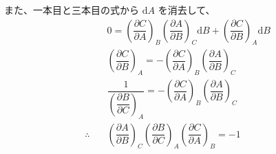 \documentclass[uplatex,dvipdfmx,a4paper,11pt]{jsarticle}
\newcommand{\diff}{\mathrm d}
\begin{document}
また、一本目と三本目の式から $\diff A$ を消去して、
\begin{align*}
&0 = \left(\dfrac{\partial C}{\partial A} \right)_B \left(\dfrac{\partial A}{\partial B} \right)_C \diff B + \left(\dfrac{\partial C}{\partial B} \right)_A \diff B \\[10pt]
&\left(\dfrac{\partial C}{\partial B} \right)_A = - \left(\dfrac{\partial C}{\partial A} \right)_B \left(\dfrac{\partial A}{\partial B} \right)_C \\[10pt]
&\dfrac{1}{ \left( \dfrac{\partial B}{\partial C} \right)_{A} } = - \left(\dfrac{\partial C}{\partial A} \right)_B \left(\dfrac{\partial A}{\partial B} \right)_C \\[10pt]
\therefore \quad &\left(\dfrac{\partial A}{\partial B} \right)_{C} \left(\dfrac{\partial B}{\partial C} \right)_{A} \left(\dfrac{\partial C}{\partial A} \right)_{B} = -1
\end{align*}
\end{document}
